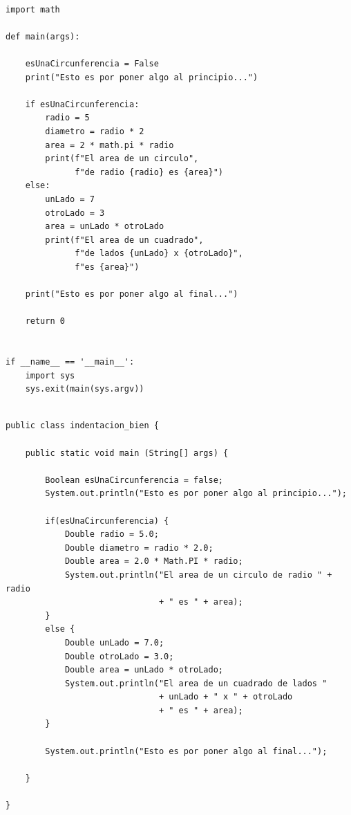 \documentclass[spanish,12pt,a4paper,final,oneside]{book}
\begin{document}
\begin{lstlisting}[frame=single, caption=lenguaje Python : indentación correcta]

import math

def main(args):

    esUnaCircunferencia = False
    print("Esto es por poner algo al principio...")

    if esUnaCircunferencia:
        radio = 5
        diametro = radio * 2
        area = 2 * math.pi * radio
        print(f"El area de un circulo",
              f"de radio {radio} es {area}")
    else:
        unLado = 7
        otroLado = 3
        area = unLado * otroLado
        print(f"El area de un cuadrado",
              f"de lados {unLado} x {otroLado}",
              f"es {area}")

    print("Esto es por poner algo al final...")

    return 0


if __name__ == '__main__':
    import sys
    sys.exit(main(sys.argv))
\end{lstlisting}

\begin{lstlisting}[frame=single, caption=lenguaje Java : indentación correcta]

public class indentacion_bien {
	
    public static void main (String[] args) {
        
        Boolean esUnaCircunferencia = false;
        System.out.println("Esto es por poner algo al principio...");
        
        if(esUnaCircunferencia) {
            Double radio = 5.0;
            Double diametro = radio * 2.0;
            Double area = 2.0 * Math.PI * radio;
            System.out.println("El area de un circulo de radio " + radio 
                               + " es " + area);
        }
        else {
            Double unLado = 7.0;
            Double otroLado = 3.0;
            Double area = unLado * otroLado;
            System.out.println("El area de un cuadrado de lados "
                               + unLado + " x " + otroLado 
                               + " es " + area);
        }
              
        System.out.println("Esto es por poner algo al final...");
        
    }
    
}
\end{lstlisting}
\end{document}
